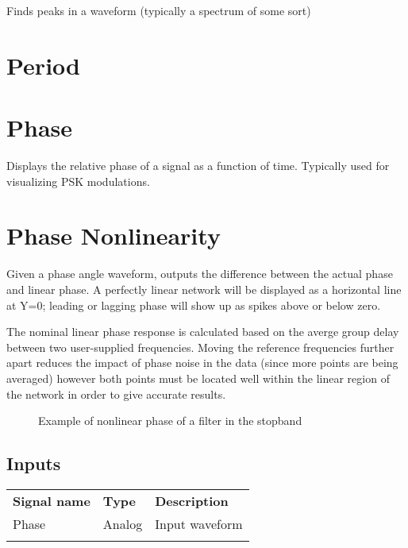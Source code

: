 Finds peaks in a waveform (typically a spectrum of some sort)

\pagebreak
\section{Period}

\pagebreak
\section{Phase}

Displays the relative phase of a signal as a function of time. Typically used for visualizing PSK modulations.

\pagebreak
\section{Phase Nonlinearity}

Given a phase angle waveform, outputs the difference between the actual phase and linear phase. A perfectly linear
network will be displayed as a horizontal line at Y=0; leading or lagging phase will show up as spikes above or below
zero.

The nominal linear phase response is calculated based on the averge group delay between two user-supplied frequencies.
Moving the reference frequencies further apart reduces the impact of phase noise in the data (since more points are
being averaged) however both points must be located well within the linear region of the network in order to give
accurate results.

\begin{figure}[h]
\centering
{}
\caption{Example of nonlinear phase of a filter in the stopband}
\label{phase_nonlinearity_example}
\end{figure}

\subsection{Inputs}

\begin{tabularx}{16cm}{llX}
\thickhline
\textbf{Signal name} & \textbf{Type} & \textbf{Description} \\
\thickhline
Phase & Analog & Input waveform \\
\thickhline
\end{tabularx}

